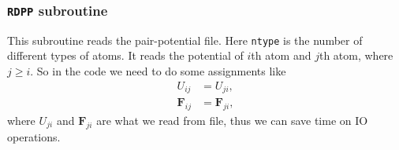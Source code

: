 
\subsubsection{\texttt{RDPP} subroutine}

This subroutine reads the pair-potential file.
Here \texttt{ntype} is the number of different types of atoms.
It reads the potential of $i$th atom and $j$th atom, where $j \geq i$.
So in the code we need to do some assignments like
\begin{align}
 U_{ij}      & = U_{ji},      \\
 \bm{F}_{ij} & = \bm{F}_{ji},
\end{align}
where $U_{ji}$ and $\bm{F}_{ji}$ are what we read from file,
thus we can save time on IO operations.
